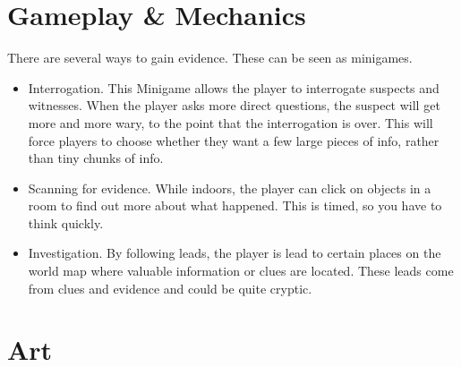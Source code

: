 \documentclass{article}
\begin{document}
\section{Gameplay \& Mechanics}
		There are several ways to gain evidence. These can be seen as minigames.
		\begin{itemize}
			\item Interrogation. 
			This Minigame allows the player to interrogate suspects and witnesses. When the player asks more direct questions, the suspect will get more and more wary, to the point that the interrogation is over. This will force players to choose whether they want a few large pieces of info, rather than tiny chunks of info.
			\item Scanning for evidence.
			While indoors, the player can click on objects in a room to find out more about what happened. This is timed, so you have to think quickly.
			\item Investigation. By following leads, the player is lead to certain places on the world map where valuable information or clues are located. These leads come from clues and evidence and could be quite cryptic.
		\end{itemize}
\newpage
\section{Art}
	
\end{document}
